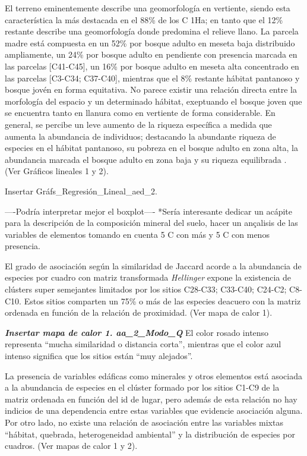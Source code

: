\documentclass[11pt,]{article}
\begin{document}
El terreno eminentemente describe una geomorfología en vertiente, siendo
esta característica la más destacada en el 88\% de los C 1Ha; en tanto
que el 12\% restante describe una geomorfología donde predomina el
relieve llano. La parcela madre está compuesta en un 52\% por bosque
adulto en meseta baja distribuido ampliamente, un 24\% por bosque adulto
en pendiente con presencia marcada en las parcelas {[}C41-C45{]}, un
16\% por bosque adulto en meseta alta concentrado en las parcelas
{[}C3-C34; C37-C40{]}, mientras que el 8\% restante hábitat pantanoso y
bosque jovén en forma equitativa. No parece existir una relación directa
entre la morfología del espacio y un determinado hábitat, exeptuando el
bosque joven que se encuentra tanto en llanura como en vertiente de
forma considerable. En general, se percibe un leve aumento de la riqueza
específica a medida que aumenta la abundancia de individuos; destacando
la abundante riqueza de especies en el hábitat pantanoso, su pobreza en
el bosque adulto en zona alta, la abundancia marcada el bosque adulto en
zona baja y su riqueza equilibrada . (Ver Gráficos lineales 1 y 2).

Insertar Gráfs\_Regresión\_Lineal\_aed\_2.

----Podría interpretar mejor el boxplot---- *Sería interesante dedicar
un acápite para la descripción de la composición mineral del suelo,
hacer un ançalisis de las variables de elementos tomando en cuenta 5 C
con más y 5 C con menos presencia.

El grado de asociación según la similaridad de Jaccard acorde a la
abundancia de especies por cuadro con matriz transformada
\emph{Hellinger} expone la existencia de clústers super semejantes
limitados por los sitios C28-C33; C33-C40; C24-C2; C8-C10. Estos sitios
comparten un 75\% o más de las especies deacuero con la matriz ordenada
en función de la relación de proximidad. (Ver mapa de calor 1).

\textbf{\emph{Insertar mapa de calor 1. aa\_2\_Modo\_Q}} El color rosado
intenso representa ``mucha similaridad o distancia corta'', mientras que
el color azul intenso significa que los sitios están ``muy alejados''.

La presencia de variables edáficas como minerales y otros elementos está
asociada a la abundancia de especies en el clúster formado por los
sitios C1-C9 de la matriz ordenada en función del id de lugar, pero
además de esta relación no hay indicios de una dependencia entre estas
variables que evidencie asociación alguna. Por otro lado, no existe una
relación de asociación entre las variables mixtas ``hábitat, quebrada,
heterogeneidad ambiental'' y la distribución de especies por cuadros.
(Ver mapas de calor 1 y 2).
\end{document}
